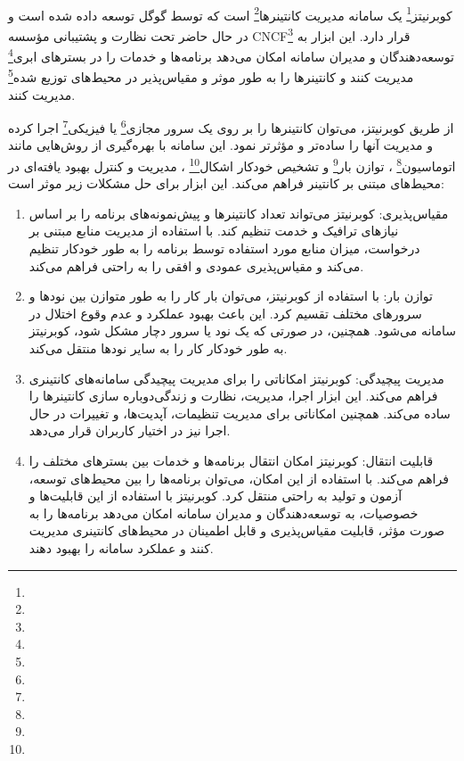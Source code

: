 \paragraph{}
{
    کوبرنیتز\footnote{}
    یک سامانه مدیریت
    کانتینرها\footnote{}
    است که توسط گوگل توسعه داده شده است و در حال حاضر تحت نظارت و پشتیبانی مؤسسه
    CNCF\footnote{}
    قرار دارد. این ابزار به توسعه‌دهندگان و مدیران سامانه امکان می‌دهد برنامه‌ها و خدمات را در
    بسترهای ابری\footnote{}
    مدیریت کنند و کانتینرها را به طور موثر و مقیاس‌پذیر در
    محیط‌های توزیع شده\footnote{}
    مدیریت کنند.
    
    از طریق کوبرنیتز، می‌توان کانتینرها را بر روی یک
    سرور مجازی\footnote{}
    یا 
    فیزیکی\footnote{}
    اجرا کرده و مدیریت آنها را ساده‌تر و مؤثرتر نمود. این سامانه با بهره‌گیری از روش‌هایی مانند
    اتوماسیون\footnote{}
    ، توازن بار\footnote{}
    و تشخیص خودکار اشکال\footnote{}
    ، مدیریت و کنترل بهبود یافته‌ای در محیط‌های مبتنی بر کانتینر فراهم می‌کند.
    این ابزار برای حل مشکلات زیر موثر است:
    \begin{enumerate}
        \item مقیاس‌پذیری: کوبرنیتز می‌تواند تعداد کانتینرها و پیش‌نمونه‌های برنامه را بر اساس نیازهای ترافیک و خدمت تنظیم کند. با استفاده از مدیریت منابع مبتنی بر درخواست، میزان منابع مورد استفاده توسط برنامه را به طور خودکار تنظیم می‌کند و مقیاس‌پذیری عمودی و افقی را به راحتی فراهم می‌کند.
        \item توازن بار: با استفاده از کوبرنیتز، می‌توان بار کار را به طور متوازن بین نودها و سرورهای مختلف تقسیم کرد. این باعث بهبود عملکرد و عدم وقوع اختلال در سامانه می‌شود. همچنین، در صورتی که یک نود یا سرور دچار مشکل شود، کوبرنیتز به طور خودکار کار را به سایر نودها منتقل می‌کند.
        \item مدیریت پیچیدگی: کوبرنیتز امکاناتی را برای مدیریت پیچیدگی سامانه‌های کانتینری فراهم می‌کند. این ابزار اجرا، مدیریت، نظارت و زندگی‌دوباره سازی کانتینرها را ساده می‌کند. همچنین امکاناتی برای مدیریت تنظیمات، آپدیت‌ها، و تغییرات در حال اجرا نیز در اختیار کاربران قرار می‌دهد.
        \item قابلیت انتقال: کوبرنیتز امکان انتقال برنامه‌ها و خدمات بین بسترهای مختلف را فراهم می‌کند. با استفاده از این امکان، می‌توان برنامه‌ها را بین محیط‌های توسعه، آزمون و تولید به راحتی منتقل کرد. کوبرنیتز با استفاده از این قابلیت‌ها و خصوصیات، به توسعه‌دهندگان و مدیران سامانه امکان می‌دهد برنامه‌ها را به صورت مؤثر، قابلیت مقیاس‌پذیری و قابل اطمینان در محیط‌های کانتینری مدیریت کنند و عملکرد سامانه را بهبود دهند.

\end{enumerate}}
